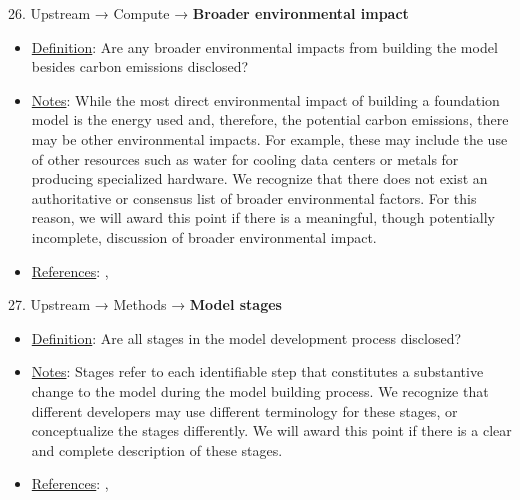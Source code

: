 26. Upstream → Compute → \textbf{Broader environmental impact}
\vspace{-\parskip}
\begin{itemize}
	\item
	\underline{Definition}: Are any broader environmental impacts from building the model besides carbon emissions disclosed?
	\item
	\underline{Notes}: While the most direct environmental impact of building a foundation model is the energy used and, therefore, the potential carbon emissions, there may be other environmental impacts. For example, these may include the use of other resources such as water for cooling data centers or metals for producing specialized hardware. We recognize that there does not exist an authoritative or consensus list of broader environmental factors. For this reason, we will award this point if there is a meaningful, though potentially incomplete, discussion of broader environmental impact.
	\item
	\underline{References}: \citet{luccioni2023counting}, \citet{strubell2019energy}
\end{itemize} \vspace{\baselineskip}


27. Upstream → Methods → \textbf{Model stages}
\vspace{-\parskip}
\begin{itemize}
	\item
	\underline{Definition}: Are all stages in the model development process disclosed?
	\item
	\underline{Notes}: Stages refer to each identifiable step that constitutes a substantive change to the model during the model building process. We recognize that different developers may use different terminology for these stages, or conceptualize the stages differently. We will award this point if there is a clear and complete description of these stages.
	\item
	\underline{References}: \citet{mitchell2019model}, \citet{chung2022scaling}
\end{itemize} \vspace{\baselineskip}


